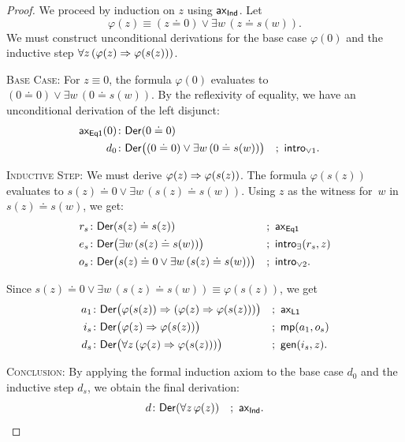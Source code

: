 \begin{proof}
    We proceed by induction on $z$ using $\mathsf{ax}_{\mathsf{Ind}}$. Let
    \[
        \varphi(z)\equiv
            (z\doteq0)\lor\exists w\,(z\doteq s(w)).
    \]
    We must construct unconditional derivations for the base case $\varphi(0)$ and the inductive step $\forall z\,(\varphi(z)\mathrel{\Rightarrow}\varphi(s(z)))$.

    \textsc{Base Case:} For $z\equiv0$, the formula $\varphi(0)$ evaluates to $(0\doteq0)\lor\exists w\,(0\doteq s(w))$. By the reflexivity of equality, we have an unconditional derivation of the left disjunct:
    {\small
    \begin{align*}
        \fun{ax_{\fun{Eq}1}}(0)&\colon\fun{Der}(0\doteq0)\\
        d_0&\colon\fun{Der}\bigl(
            (0\doteq0)\lor\exists w\,(0\doteq s(w))
        \bigr)
            &&;\ \fun{intro}_{\lor1}.
    \end{align*}}

    \textsc{Inductive Step:} We must derive $\varphi(z) \mathrel{\Rightarrow} \varphi(s(z))$. The formula $\varphi(s(z))$ evaluates to $s(z) \doteq 0 \lor \exists w\,(s(z) \doteq s(w))$. Using $z$ as the witness for~$w$ in $s(z)\doteq s(w)$, we get:
    {\small
    \begin{align*}
        r_s&\colon\fun{Der}(s(z)\doteq s(z))
            &&;\ \fun{ax}_{\fun{Eq1}}\\
        e_s&\colon\fun{Der}\bigl(
            \exists w\,(s(z)\doteq s(w))
        \bigr)
            &&;\ \fun{intro}_\exists(r_s,z)\\
        o_s&\colon\fun{Der}\bigl(s(z) \doteq 0 \lor \exists w\,(s(z) \doteq s(w))\bigr)
            &&;\ \fun{intro}_{\lor 2}.
    \end{align*}}
    
    Since $s(z)\doteq0\lor\exists w\,(s(z)\doteq s(w))\equiv\varphi(s(z))$, we get
    {\small
    \begin{align*}
        a_1&\colon\fun{Der}\bigl(\varphi(s(z)) \imp (\varphi(z) \imp \varphi(s(z)))\bigr)
            &&;\ \fun{ax}_{\fun{L1}}\\
        i_s&\colon\fun{Der}\bigl(\varphi(z) \imp \varphi(s(z))\bigr)
            &&;\ \fun{mp}(a_1, o_s)\\
        d_s&\colon\fun{Der}\bigl(\forall z\,(\varphi(z) \imp \varphi(s(z)))\bigr)
            &&;\ \fun{gen}(i_s, z).
    \end{align*}}

    \textsc{Conclusion:} By applying the formal induction axiom to the base case $d_0$ and the inductive step $d_s$, we obtain the final derivation:
    \[
        d\colon\fun{Der}(\forall z\,\varphi(z)) \quad;\ \fun{ax}_{\fun{Ind}}.
    \]
\end{proof}

